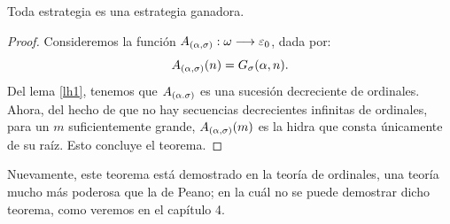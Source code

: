 \begin{thm}
    Toda estrategia es una estrategia ganadora.
\end{thm}
\begin{proof}
    Consideremos la función $A_{(\alpha,\sigma)}:\omega\longrightarrow\varepsilon_0$, dada por: 
    \[A_{(\alpha,\sigma)}(n)=G_\sigma(\alpha,n).\]
    Del lema \ref{lh1}, tenemos que $A_{(\alpha.\sigma)}$ es una sucesión decreciente de ordinales.
    Ahora, del hecho de que no hay secuencias decrecientes infinitas de ordinales, para un $m$ suficientemente grande, $A_{(\alpha,\sigma)}(m)$ es la hidra que consta únicamente de su raíz. Esto concluye el teorema.
\end{proof}
Nuevamente, este teorema está demostrado en la teoría de ordinales, una teoría mucho más poderosa que la de Peano; en la cuál no se puede demostrar dicho teorema, como veremos en el capítulo 4.